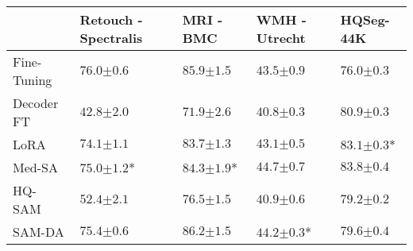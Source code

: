 \begin{table}[t]
\centering
\begin{tabular}{@{}p{3cm}P{2cm}P{1.4cm}P{1.4cm}P{1.75cm}@{}}
\toprule
  & Retouch - Spectralis & MRI - BMC & WMH - Utrecht & HQSeg-44K  \\ \midrule
Fine-Tuning &  $76.0{\scriptstyle \pm 0.6}$ & $85.9{\scriptstyle \pm 1.5}$ & $43.5{\scriptstyle \pm 0.9}$ & $76.0{\scriptstyle \pm 0.3}$  \\ \midrule
Decoder FT  & $42.8{\scriptstyle \pm 2.0}$ & $71.9{\scriptstyle \pm 2.6}$ & $40.8{\scriptstyle \pm 0.3}$ & $80.9{\scriptstyle \pm 0.3}$  \\
LoRA~{\footnotesize\parencite{hu2022lora}} & $74.1{\scriptstyle \pm 1.1}$ & $83.7{\scriptstyle \pm 1.3}$ & $43.1{\scriptstyle \pm 0.5}$ & $83.1{\scriptstyle \pm 0.3}$*  \\
Med-SA~{\footnotesize\parencite{wu2023medical}}  & $75.0{\scriptstyle \pm 1.2}$* & $84.3{\scriptstyle \pm 1.9}$* & $\mathbf{44.7}{\scriptstyle \pm 0.7}$ & $\mathbf{83.8}{\scriptstyle \pm 0.4}$  \\
HQ-SAM~{\footnotesize\parencite{ke2024segment}}  & $52.4{\scriptstyle \pm 2.1}$ & $76.5{\scriptstyle \pm 1.5}$ & $40.9{\scriptstyle \pm 0.6}$ & $79.2{\scriptstyle \pm 0.2}$  \\ \midrule
SAM-DA  & $\mathbf{75.4}{\scriptstyle \pm 0.6}$ & $\mathbf{86.2}{\scriptstyle \pm 1.5}$ & $44.2{\scriptstyle \pm 0.3}$* & $79.6{\scriptstyle \pm 0.4}$  \\ \bottomrule
\end{tabular}
\end{table}